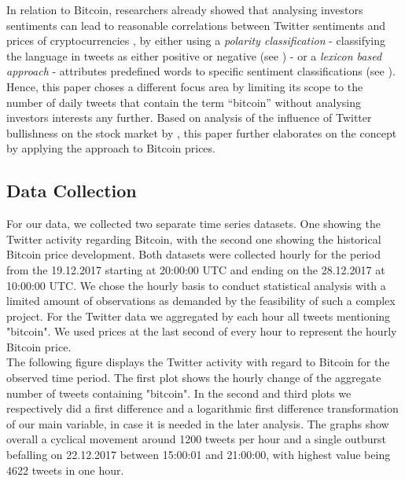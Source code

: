 \documentclass[a4paper,american,12pt]{article}
\begin{document}
\begin{spacing}{1.2}
In relation to Bitcoin, researchers already showed that analysing investors sentiments can lead to reasonable correlations between Twitter sentiments and prices of cryptocurrencies \textcite[p.~7]{stenqvist2017predicting} , by either using a \textit{polarity classification} {-} classifying the language in tweets as either positive or negative (see \cite{colianni2015algorithmic}) {-} or a \textit{lexicon based approach} {-} attributes predefined words to specific sentiment classifications (see \cite{stenqvist2017predicting}). Hence, this paper choses a different focus area by limiting its scope to the number of daily tweets that contain the term “bitcoin” without analysing investors interests any further. Based on analysis of the influence of Twitter bullishness on the stock market by \textcite{mao2015quantifying}, this paper further elaborates on the concept by applying the approach to Bitcoin prices.\\

		
\subsection{Data Collection}
For our data, we collected two separate time series datasets. One showing the Twitter activity regarding Bitcoin, with the second one showing the historical Bitcoin price development. Both datasets were collected hourly for the period from the 19.12.2017 starting at 20:00:00 UTC and ending on the 28.12.2017 at 10:00:00 UTC. We chose the hourly basis to conduct statistical analysis with a limited amount of observations as demanded by the feasibility of such a complex project. For the Twitter data we aggregated by each hour all tweets mentioning "bitcoin". We used prices at the last second of every hour to represent the hourly Bitcoin price.\\
The following figure displays the Twitter activity with regard to Bitcoin for the observed time period. The first plot shows the hourly change of the aggregate number of tweets containing "bitcoin". In the second and third plots we respectively did a first difference and a logarithmic first difference transformation of our main variable, in case it is needed in the later analysis. The graphs show overall a cyclical movement around 1200 tweets per hour and a single outburst befalling on 22.12.2017 between 15:00:01 and 21:00:00, with highest value being 4622 tweets in one hour.\\


\end{spacing}
\end{document}
